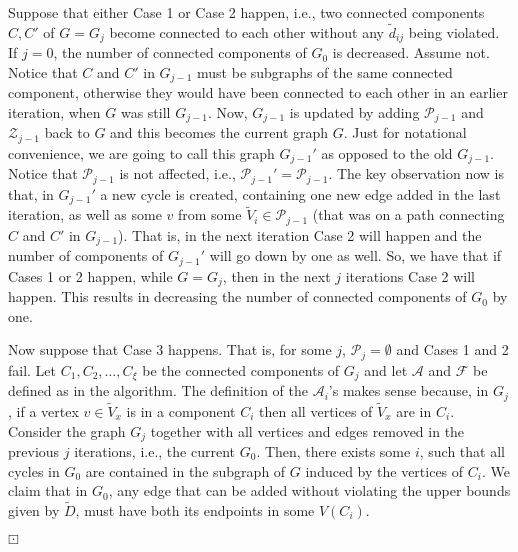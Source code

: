 \documentclass[12pt,a4paper]{article}
\theoremstyle{definition}
\theoremstyle{plain}
\newenvironment{prf}{\noindent {\bf Proof.}}{\begin{flushright}\vspace{-2em}\footnotesize$\boxdot$\normalsize\end{flushright}\smallskip}
\begin{document}
\begin{prf}
Suppose that either Case 1 or Case 2 happen,
i.e., two connected components $C,C'$
of $G=G_j$ become connected to each other without any $\widetilde{d}_{ij}$ 
being violated. 
If $j=0$, the number of connected components of $G_0$ is 
decreased. 
Assume not. 
Notice that $C$ and $C'$ in $G_{j-1}$ must be subgraphs of
the same connected component, 
otherwise they would have been connected 
to each other in an earlier iteration,
when $G$ was still $G_{j-1}$. 
Now, $G_{j-1}$ is updated by adding $\mathcal P_{j-1}$ and $\mathcal Z_{j-1}$
back to $G$ and this becomes the current graph $G$. 
Just for notational convenience, we are going to call this graph 
$G_{j-1}'$ as opposed to the old $G_{j-1}$. 
Notice that $\mathcal P_{j-1}$ is not affected, i.e.,
$\mathcal P_{j-1}'=\mathcal P_{j-1}$. 
The key observation now is that, in $G_{j-1}'$ a new cycle is created, 
containing 
one new edge added in the last iteration, 
as well as some $v$ from some $\widetilde{V}_i\in \mathcal P_{j-1}$ 
(that was on a path connecting $C$ and $C'$ in $G_{j-1}$). 
That is, in the next iteration Case 2 will happen
and the number of components of $G_{j-1}'$ will go down by one as well.
So, we have that if Cases 1 or 2 happen, while $G=G_j$, 
then in the next $j$ iterations
Case 2 will happen. 
This results in decreasing the number 
of connected components of $G_{0}$ by one. 

Now suppose that Case 3 happens.
That is, for some $j$, $\mathcal P_j=\emptyset$ and Cases 1 and 2 fail.
Let $C_1,C_2,\ldots,C_{\xi}$ be the connected components of $G_j$ 
and let $\mathcal A$ and 
$\mathcal F$ be defined as in the algorithm. 
The definition of the
$\mathcal A_i$'s makes sense because, in $G_j$, 
if a vertex $v\in\widetilde{V}_x$ is in a component
$C_i$ then all vertices of $\widetilde{V}_x$ are in $C_i$.
Consider the graph $G_j$ together with 
all vertices and edges removed in the previous $j$ iterations, 
i.e., the current $G_0$. Then, there exists some $i$,
such that all cycles in $G_0$
are contained in the subgraph of $G$ induced by the vertices of $C_i$. 
We claim that
in $G_0$, any edge that can be added without violating the upper bounds 
given by $\widetilde{D}$,
must have both its endpoints in some $V(C_i)$.


\end{prf}
\end{document}
